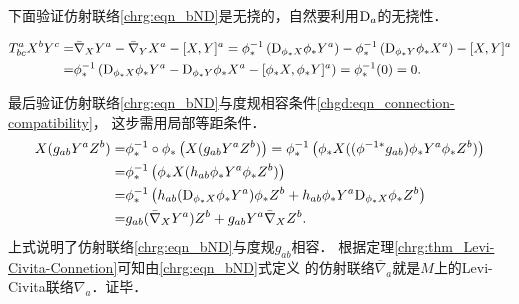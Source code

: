下面验证仿射联络\eqref{chrg:eqn_bND}是无挠的，自然要利用${\rm D}_a$的无挠性．
\begin{small}
\begin{align*}
	T^a_{bc} X^b Y^c = & \bar{\nabla}_X Y^a - \bar{\nabla}_Y X^a -[X,Y]^a 
	=  \phi^{-1}_* \left( {\rm D}_{\phi_* X} \phi_*Y^a \right) 
	-\phi^{-1}_* \left( {\rm D}_{\phi_* Y} \phi_*X^a \right) -[X,Y]^a \\
	=&\phi^{-1}_* \left( {\rm D}_{\phi_* X} \phi_*Y^a 
	-  {\rm D}_{\phi_* Y} \phi_*X^a -[\phi_*X,\phi_*Y]^a \right) 
	=\phi^{-1}_*(0) = 0.
\end{align*} %
\end{small}
最后验证仿射联络\eqref{chrg:eqn_bND}与度规相容条件\eqref{chgd:eqn_connection-compatibility}，
这步需用局部等距条件．
\begin{align*}
	X(g_{ab} Y^a Z^b) = & \phi^{-1}_*\circ \phi_* \left(X(g_{ab} Y^a Z^b) \right)
	=\phi^{-1}_*  \left(\phi_* X( (\phi^{-1*}g_{ab}) \phi_*Y^a \phi_*Z^b) \right) \\
	=& \phi^{-1}_*  \left(\phi_* X(h_{ab} \phi_*Y^a \phi_*Z^b) \right)\\
	=& \phi^{-1}_*  \left(h_{ab} ({\rm D}_{\phi_* X} \phi_*Y^a) \phi_*Z^b
	 + h_{ab} \phi_*Y^a {\rm D}_{\phi_* X}\phi_*Z^b\right) \\
	=&g_{ab} (\bar{\nabla}_{X} Y^a) Z^b + g_{ab} Y^a \bar{\nabla}_{X} Z^b .
\end{align*}
上式说明了仿射联络\eqref{chrg:eqn_bND}与度规$g_{ab}$相容．
根据定理\ref{chrg:thm_Levi-Civita-Connetion}可知由\eqref{chrg:eqn_bND}式定义
的仿射联络$\bar{\nabla}_a$就是$M$上的Levi-Civita联络${\nabla}_a$．证毕．



